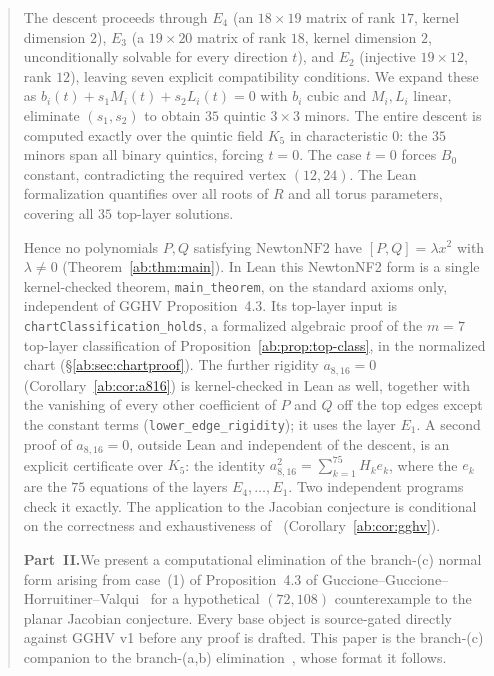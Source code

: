 \documentclass[a4paper,11pt]{article}
\theoremstyle{plain}
\theoremstyle{definition}
\theoremstyle{remark}
\begin{document}
\begin{abstract}
The descent proceeds through $E_4$ (an $18\times19$ matrix of rank $17$, kernel dimension $2$), $E_3$ (a $19\times20$ matrix of rank $18$, kernel dimension $2$, unconditionally solvable for every direction $t$), and $E_2$ (injective $19\times 12$, rank $12$), leaving seven explicit compatibility conditions. We expand these as $b_i(t)+s_1M_i(t)+s_2L_i(t)=0$ with $b_i$ cubic and $M_i,L_i$ linear, eliminate $(s_1,s_2)$ to obtain $35$ quintic $3\times3$ minors. The entire descent is computed exactly over the quintic field $K_5$ in characteristic $0$: the $35$ minors span all binary quintics, forcing $t=0$. The case $t=0$ forces $B_0$ constant, contradicting the required vertex $(12,24)$. The Lean formalization quantifies over all roots of $R$ and all torus parameters, covering all $35$ top-layer solutions.

Hence no polynomials $P,Q$ satisfying $\mathrm{NewtonNF2}$ have $[P,Q]=\lambda x^2$ with $\lambda\neq0$ (Theorem~\ref{ab:thm:main}). In Lean this NewtonNF2 form is a single kernel-checked theorem, \texttt{main\_theorem}, on the standard axioms only, independent of GGHV Proposition~4.3. Its top-layer input is \texttt{chartClassification\_holds}, a formalized algebraic proof of the $m=7$ top-layer classification of Proposition~\ref{ab:prop:top-class}, in the normalized chart (\S\ref{ab:sec:chartproof}). The further rigidity $a_{8,16}=0$ (Corollary~\ref{ab:cor:a816}) is kernel-checked in Lean as well, together with the vanishing of every other coefficient of $P$ and $Q$ off the top edges except the constant terms (\texttt{lower\_edge\_rigidity}); it uses the layer $E_1$. A second proof of $a_{8,16}=0$, outside Lean and independent of the descent, is an explicit certificate over $K_5$: the identity $a_{8,16}^2=\sum_{k=1}^{75}H_ke_k$, where the $e_k$ are the $75$ equations of the layers $E_4,\dots,E_1$. Two independent programs check it exactly. The application to the Jacobian conjecture is conditional on the correctness and exhaustiveness of~\cite[Proposition~4.3]{GGHV} (Corollary~\ref{ab:cor:gghv}).

\medskip

\textbf{Part~II.}\enspace We present a computational elimination of the branch-(c) normal form arising from case~(1) of Proposition~4.3 of Guccione--Guccione--Horruitiner--Valqui~\cite{GGHV} for a hypothetical $(72,108)$ counterexample to the planar Jacobian conjecture. Every base object is source-gated directly against GGHV v1 before any proof is drafted. This paper is the branch-(c) companion to the branch-(a,b) elimination~\cite{BranchABv19}, whose format it follows.


\end{abstract}
\end{document}
